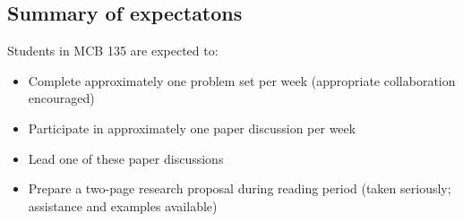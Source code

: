 \documentclass{article}
\begin{document}
\subsection*{Summary of expectatons}

Students in MCB 135 are expected to:

\begin{itemize}
\item Complete approximately one problem set per week (appropriate collaboration encouraged)
\item Participate in approximately one paper discussion per week
\item Lead one of these paper discussions
\item Prepare a two-page research proposal during reading period (taken seriously; assistance and examples available)
\end{itemize}
\end{document}
